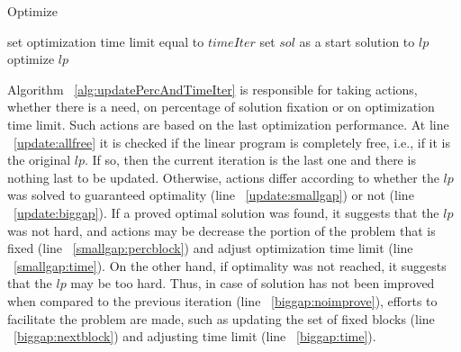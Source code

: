 \begin{algorithm}[H]
  \caption{Optimize
    \label{alg:optimize}}
  \begin{algorithmic}[1]
			\State set optimization time limit equal to $timeIter$
			\State set $sol$ as a start solution to $lp$	
			\State optimize $lp$
			\EndIf
    \EndProcedure	
  \end{algorithmic}	
\end{algorithm}		

Algorithm ~\ref{alg:updatePercAndTimeIter} is responsible for taking actions, whether there is a need, on percentage of solution fixation or on optimization time limit. Such actions are based on the last optimization performance. At line ~\ref{update:allfree} it is checked if the linear program is completely free, i.e., if it is the original $lp$. If so, then the current iteration is the last one and there is nothing last to be updated. Otherwise, actions differ according to whether the $lp$ was solved to guaranteed optimality (line ~\ref{update:smallgap}) or not (line ~\ref{update:biggap}). If a proved optimal solution was found, it suggests that the $lp$ was not hard, and actions may be decrease the portion of the problem that is fixed (line ~\ref{smallgap:percblock}) and adjust optimization time limit (line ~\ref{smallgap:time}). On the other hand, if optimality was not reached, it suggests that the $lp$ may be too hard. Thus, in case of solution has not been improved when compared to the previous iteration (line ~\ref{biggap:noimprove}), efforts to facilitate the problem are made, such as updating the set of fixed blocks (line ~\ref{biggap:nextblock}) and adjusting time limit (line ~\ref{biggap:time}).


